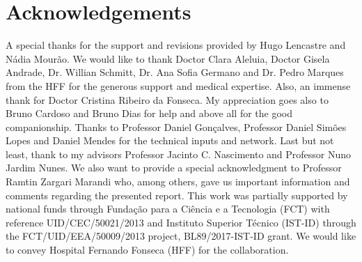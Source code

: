 
\section{Acknowledgements}
\label{sec:sec012}

A special thanks for the support and revisions provided by Hugo Lencastre and N\'{a}dia Mour\~{a}o. We would like to thank Doctor Clara Aleluia, Doctor Gisela Andrade, Dr. Willian Schmitt, Dr. Ana Sofia Germano and Dr. Pedro Marques from the HFF for the generous support and medical expertise. Also, an immense thank for Doctor Cristina Ribeiro da Fonseca. My appreciation goes also to Bruno Cardoso and Bruno Dias for help and above all for the good companionship. Thanks to Professor Daniel Gon\c{c}alves, Professor Daniel Sim\~{o}es Lopes and Daniel Mendes for the technical inputs and network. Last but not least, thank to my advisors Professor Jacinto C. Nascimento and Professor Nuno Jardim Nunes. We also want to provide a special acknowledgment to Professor Ramtin Zargari Marandi who, among others, gave us important information and comments regarding the presented report. This work was partially supported by national funds through Funda\c{c}\~{a}o para a Ci\^{e}ncia e a Tecnologia (FCT) with reference UID/CEC/50021/2013 and Instituto Superior T\'{e}cnico (IST-ID) through the FCT/UID/EEA/50009/2013 project, BL89/2017-IST-ID grant. We would like to convey Hospital Fernando Fonseca (HFF) for the collaboration.

